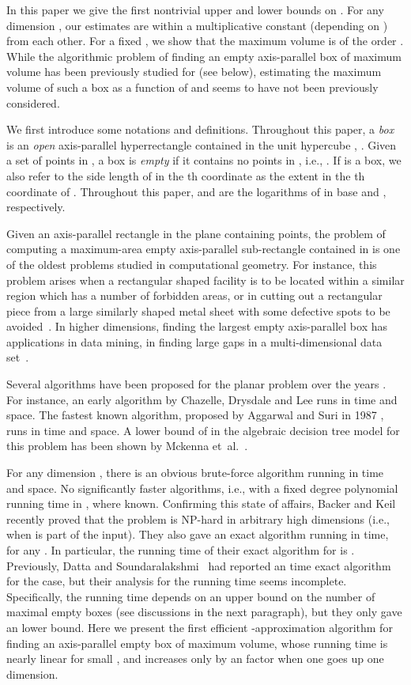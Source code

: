 \documentclass[11pt]{article}
\begin{document}
In this paper we give the first nontrivial upper and lower bounds on .
For any dimension , our estimates are within a multiplicative
constant (depending on ) from each other. For a fixed , we show
that the maximum volume is of the order .   
While the algorithmic problem of finding an empty axis-parallel box
of maximum volume has been previously studied for  (see below),
estimating the maximum volume of such a box as a function of  and
 seems to have not been previously considered. 

We first introduce some notations and definitions. Throughout this paper,
a \emph{box} is an \emph{open} axis-parallel hyperrectangle
contained in the unit hypercube , .
Given a set  of points in ,
a box  is \emph{empty} if it contains no points in ,
i.e., .
If  is a box, we also refer to the side length of  in the th
coordinate as the extent in the th coordinate of . 
Throughout this paper,  and  are the logarithms of  in
base  and , respectively.

Given an axis-parallel rectangle  in the plane containing  points,
the problem of computing a maximum-area empty axis-parallel
sub-rectangle contained in  is one of the oldest problems studied 
in computational geometry. For instance, this problem arises 
when a rectangular shaped facility is to be located within a
similar region which has a number of forbidden areas, or in cutting
out a rectangular piece from a large similarly shaped metal sheet with
some defective spots to be avoided~\cite{NLH84}. In higher dimensions,
finding the largest empty axis-parallel box has applications
in data mining, in finding large gaps in a multi-dimensional data
set~\cite{EGLM03}. 

Several algorithms have been proposed for the planar problem
over the years \cite{AS87,AF86,AK89,CDL86,D92,MOS85,NLH84,O90}. 
For instance, an early algorithm by Chazelle, Drysdale and Lee
\cite{CDL86} runs in  time and  space.
The fastest known algorithm,
proposed by Aggarwal and Suri in 1987 \cite{AS87},
runs in  time and  space. 
A lower bound of  in the algebraic decision tree
model for this problem has been shown by Mckenna et~al.\ \cite{MOS85}.

For any dimension , there is an obvious brute-force algorithm
running in  time and  space. 
No significantly faster algorithms, i.e., with a fixed degree
polynomial running time in , where known.
Confirming this state of affairs,
Backer and Keil~\cite{BK09a,BK09b} recently proved that the problem is
NP-hard in arbitrary high dimensions (i.e., when  is part of the input).
They also gave an exact algorithm running in 
time, for any .  
In particular, the running time of their exact algorithm for  is
. Previously, Datta and Soundaralakshmi~\cite{DS00}
had reported an  time exact algorithm for the  case, but
their analysis for the running time seems incomplete. Specifically,
the  running time depends on an  upper bound on the
number of maximal empty boxes (see discussions in the next paragraph),
but they only gave an  lower bound.
Here we present the first efficient -approximation algorithm 
for finding an axis-parallel empty box of maximum volume, 
whose running time is nearly linear for small , and increases only
by an  factor when one goes up one dimension. 
\end{document}
